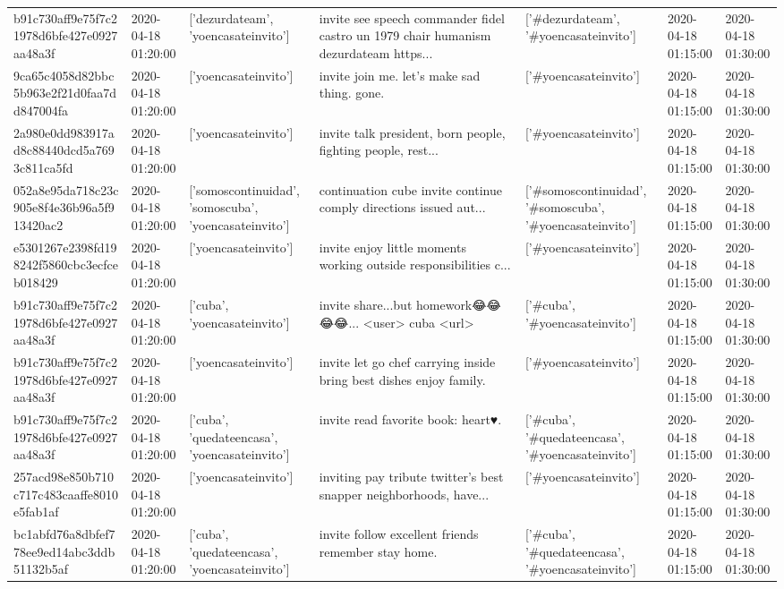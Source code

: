 \begin{tabular}{lllllll}
b91c730aff9e75f7c21978d6bfe427e0927aa48a3f & 2020-04-18 01:20:00 & ['dezurdateam', 'yoencasateinvito'] & invite see speech commander fidel castro un 1979 chair humanism dezurdateam https... & ['#dezurdateam', '#yoencasateinvito'] & 2020-04-18 01:15:00 & 2020-04-18 01:30:00 \\
9ca65c4058d82bbc5b963e2f21d0faa7dd847004fa & 2020-04-18 01:20:00 & ['yoencasateinvito'] & invite join me. let's make sad thing. gone. & ['#yoencasateinvito'] & 2020-04-18 01:15:00 & 2020-04-18 01:30:00 \\
2a980e0dd983917ad8c88440dcd5a7693c811ca5fd & 2020-04-18 01:20:00 & ['yoencasateinvito'] & invite talk president, born people, fighting people, rest... & ['#yoencasateinvito'] & 2020-04-18 01:15:00 & 2020-04-18 01:30:00 \\
052a8e95da718c23c905e8f4e36b96a5f913420ac2 & 2020-04-18 01:20:00 & ['somoscontinuidad', 'somoscuba', 'yoencasateinvito'] & continuation cube invite continue comply directions issued aut... & ['#somoscontinuidad', '#somoscuba', '#yoencasateinvito'] & 2020-04-18 01:15:00 & 2020-04-18 01:30:00 \\
e5301267e2398fd198242f5860cbc3ecfceb018429 & 2020-04-18 01:20:00 & ['yoencasateinvito'] & invite enjoy little moments working outside responsibilities c... & ['#yoencasateinvito'] & 2020-04-18 01:15:00 & 2020-04-18 01:30:00 \\
b91c730aff9e75f7c21978d6bfe427e0927aa48a3f & 2020-04-18 01:20:00 & ['cuba', 'yoencasateinvito'] & invite share...but homework😂😂😂😂... <user> cuba <url> & ['#cuba', '#yoencasateinvito'] & 2020-04-18 01:15:00 & 2020-04-18 01:30:00 \\
b91c730aff9e75f7c21978d6bfe427e0927aa48a3f & 2020-04-18 01:20:00 & ['yoencasateinvito'] & invite let go chef carrying inside bring best dishes enjoy family. & ['#yoencasateinvito'] & 2020-04-18 01:15:00 & 2020-04-18 01:30:00 \\
b91c730aff9e75f7c21978d6bfe427e0927aa48a3f & 2020-04-18 01:20:00 & ['cuba', 'quedateencasa', 'yoencasateinvito'] & invite read favorite book: heart♥️. & ['#cuba', '#quedateencasa', '#yoencasateinvito'] & 2020-04-18 01:15:00 & 2020-04-18 01:30:00 \\
257acd98e850b710c717c483caaffe8010e5fab1af & 2020-04-18 01:20:00 & ['yoencasateinvito'] & inviting pay tribute twitter's best snapper neighborhoods, have... & ['#yoencasateinvito'] & 2020-04-18 01:15:00 & 2020-04-18 01:30:00 \\
bc1abfd76a8dbfef778ee9ed14abc3ddb51132b5af & 2020-04-18 01:20:00 & ['cuba', 'quedateencasa', 'yoencasateinvito'] & invite follow excellent friends remember stay home. & ['#cuba', '#quedateencasa', '#yoencasateinvito'] & 2020-04-18 01:15:00 & 2020-04-18 01:30:00 \\

\end{tabular}
